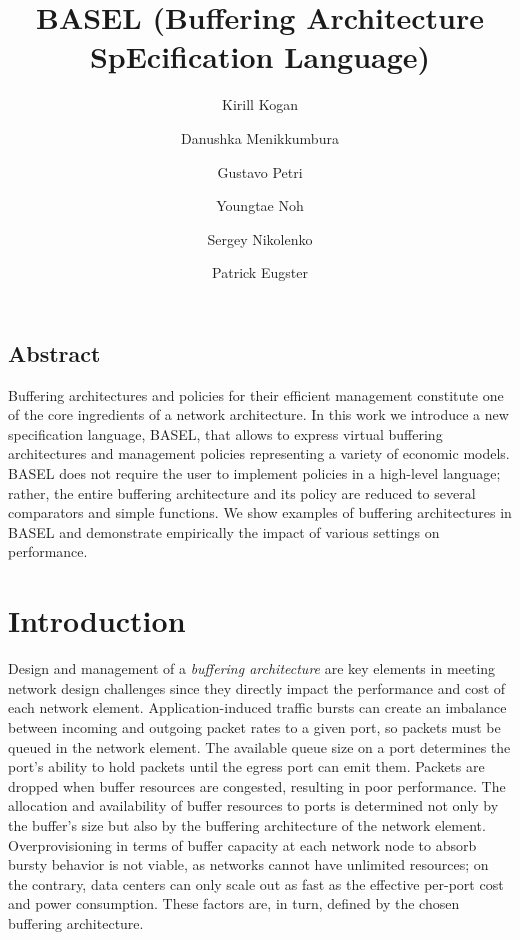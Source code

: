 \documentclass{article}
\newcommand{\barch}{BASEL}
\begin{document}
\title{\barch{} (Buffering Architecture SpEcification Language)}
\author[1]{Kirill Kogan}
\author[2]{Danushka Menikkumbura}
\author[3]{Gustavo Petri}
\author[4]{Youngtae Noh}
\author[5]{Sergey Nikolenko}
\author[2,6]{Patrick Eugster}



\maketitle




\subsection*{Abstract}
Buffering architectures and policies for their efficient management constitute one of the core ingredients of a network architecture. In this work we introduce a new specification language, \barch{}, that allows to express virtual buffering architectures and management policies representing a variety of economic models. \barch{} does not require the user to implement policies in a high-level language; rather, the entire buffering architecture and its policy are reduced to several comparators and simple functions. We show examples of buffering architectures in \barch{} and demonstrate empirically the impact of various settings on performance.

\section{Introduction}



Design and management of a \emph{buffering architecture} are key elements in meeting network design challenges since they directly impact the performance and cost of each network element.
Application-induced traffic bursts can create an imbalance between incoming and outgoing packet rates to a given port, so packets must be queued in the network element. The available queue size on a port determines the port's ability to hold packets until the egress port can emit them. Packets are dropped when buffer resources are congested,  resulting in poor performance. The allocation and availability of buffer resources to ports is determined not only by the buffer's size but also by the buffering architecture of the network element. Overprovisioning in terms of buffer capacity at each network node to absorb bursty behavior is not viable, as networks cannot have unlimited resources; on the contrary, data centers can only scale out as fast as the effective per-port cost and power consumption. These factors are, in turn, defined by the chosen buffering architecture.
\end{document}
